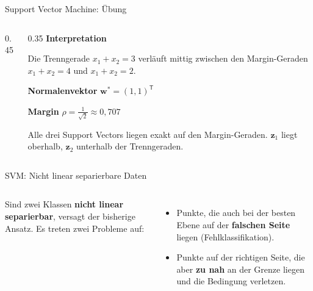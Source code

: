 {\begin{frame}{Support Vector Machine: Übung}
{\begin{columns}[T,onlytextwidth]
\begin{column}{0.45\textwidth}
{}
\end{column}

\begin{column}{0.35\textwidth}
\footnotesize
\textbf{Interpretation}

Die Trenngerade $x_1 + x_2 = 3$ verläuft mittig zwischen den Margin-Geraden
$x_1 + x_2 = 4$ und $x_1 + x_2 = 2$.

\vspace{0.6em}
\textbf{Normalenvektor} $\mathbf{w}^{*} = (1,1)^{\mathsf{T}}$

\textbf{Margin} $\rho = \frac{1}{\sqrt{2}} \approx 0{,}707$

\vspace{0.6em}
Alle drei Support Vectors liegen exakt auf den Margin-Geraden. $\mathbf{z}_1$
liegt oberhalb, $\mathbf{z}_2$ unterhalb der Trenngeraden.
\end{column}

\end{columns}
}

\end{frame}
}




\begin{frame}{SVM: Nicht linear separierbare Daten}
\begin{columns}
\centering


Sind zwei Klassen \textbf{nicht linear separierbar}, versagt der bisherige
Ansatz. Es treten zwei Probleme auf:
\begin{itemize}
  \item Punkte, die auch bei der besten Ebene auf der \textbf{falschen Seite} liegen (Fehlklassifikation).
  \item Punkte auf der richtigen Seite, die aber \textbf{zu nah} an der Grenze liegen und die Bedingung verletzen.
\end{itemize}
\end{columns}

\end{frame}

